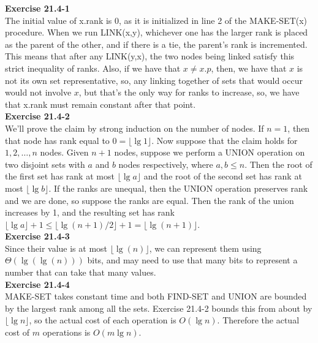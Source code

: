 \documentclass{article}
\begin{document}
\noindent\textbf{Exercise 21.4-1}\\

The initial value of x.rank is 0, as it is initialized in line 2 of the MAKE-SET(x) procedure. When we run LINK(x,y), whichever one has the larger rank is placed as the parent of the other, and if there is a tie, the parent's rank is incremented. This means that after any LINK(y,x), the two nodes being linked satisfy this strict inequality of ranks. Also, if we have that $x\neq x.p$, then, we have that $x$ is not its own set representative, so, any linking together of sets that would occur would not involve $x$, but that's the only way for ranks to increase, so, we have that x.rank must remain constant after that point.\\

\noindent\textbf{Exercise 21.4-2}\\

We'll prove the claim by strong induction on the number of nodes.  If $n=1$, then that node has rank equal to $0 = \lfloor \lg 1 \rfloor$.  Now suppose that the claim holds for $1, 2, \ldots, n$ nodes.  Given $n+1$ nodes, suppose we perform a UNION operation on two disjoint sets with $a$ and $b$ nodes respectively, where $a, b \leq n$.  Then the root of the first set has rank at most $\lfloor \lg a \rfloor$ and the root of the second set has rank at most $\lfloor \lg b \rfloor$.  If the ranks are unequal, then the UNION operation preserves rank and we are done, so suppose the ranks are equal.  Then the rank of the union increases by 1, and the resulting set has rank $\lfloor \lg a \rfloor + 1 \leq \lfloor \lg (n+1)/2 \rfloor + 1 = \lfloor \lg(n+1) \rfloor$. \\

\noindent\textbf{Exercise 21.4-3}\\

Since their value is at most $\lfloor \lg(n)\rfloor$, we can represent them using $\Theta(\lg(\lg(n)))$ bits, and may need to use that many bits to represent a number that can take that many values.\\

\noindent\textbf{Exercise 21.4-4}\\

MAKE-SET takes constant time and both FIND-SET and UNION are bounded by the largest rank among all the sets.  Exercise 21.4-2 bounds this from about by $\lfloor \lg n \rfloor$, so the actual cost of each operation is $O(\lg n)$.  Therefore the actual cost of $m$ operations is $O(m\lg n)$. \\
\end{document}
